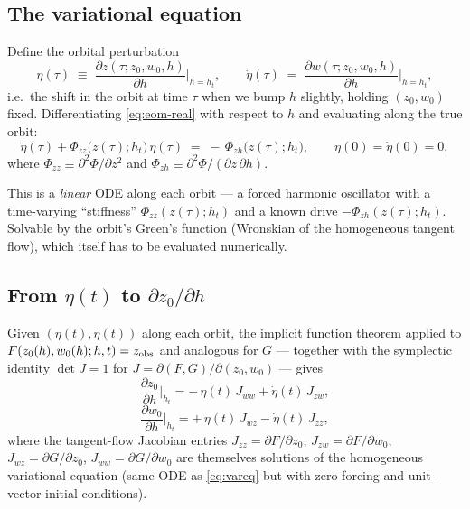 \documentclass[11pt]{article}
\begin{document}
\subsection{The variational equation}

Define the orbital perturbation
\begin{equation}
\eta(\tau) \;\equiv\; \frac{\partial z(\tau;z_0,w_0,h)}{\partial h}\bigg|_{h=h_t},
\qquad
\dot\eta(\tau) \;=\; \frac{\partial w(\tau;z_0,w_0,h)}{\partial h}\bigg|_{h=h_t},
\end{equation}
i.e.\ the shift in the orbit at time $\tau$ when we bump $h$ slightly, holding
$(z_0,w_0)$ fixed. Differentiating \eqref{eq:eom-real} with respect to $h$ and
evaluating along the true orbit:
\begin{equation}
\boxed{\;
\ddot\eta(\tau) + \Phi_{zz}\!\big(z(\tau);h_t\big)\,\eta(\tau)
\;=\; -\,\Phi_{zh}\!\big(z(\tau);h_t\big),
\qquad \eta(0)=\dot\eta(0)=0,
\;}
\label{eq:vareq}
\end{equation}
where $\Phi_{zz}\equiv\partial^2\Phi/\partial z^2$ and
$\Phi_{zh}\equiv\partial^2\Phi/(\partial z\,\partial h)$.

This is a \emph{linear} ODE along each orbit — a forced harmonic oscillator with a
time-varying ``stiffness'' $\Phi_{zz}(z(\tau);h_t)$ and a known drive
$-\Phi_{zh}(z(\tau);h_t)$. Solvable by the orbit's Green's function (Wronskian of the
homogeneous tangent flow), which itself has to be evaluated numerically.

\subsection{From $\eta(t)$ to $\partial z_0/\partial h$}

Given $(\eta(t),\dot\eta(t))$ along each orbit, the implicit function theorem applied
to $F(z_0(h),w_0(h);h,t)=z_{\rm obs}$ and analogous for $G$ — together with the
symplectic identity $\det J=1$ for $J = \partial(F,G)/\partial(z_0,w_0)$ — gives
\begin{equation}
\frac{\partial z_0}{\partial h}\bigg|_{h_t}
= -\,\eta(t)\,J_{ww} + \dot\eta(t)\,J_{zw},
\end{equation}
\begin{equation}
\frac{\partial w_0}{\partial h}\bigg|_{h_t}
= +\,\eta(t)\,J_{wz} - \dot\eta(t)\,J_{zz},
\end{equation}
where the tangent-flow Jacobian entries
$J_{zz}=\partial F/\partial z_0$, $J_{zw}=\partial F/\partial w_0$,
$J_{wz}=\partial G/\partial z_0$, $J_{ww}=\partial G/\partial w_0$
are themselves solutions of the homogeneous variational equation (same ODE as
\eqref{eq:vareq} but with zero forcing and unit-vector initial conditions).
\end{document}
